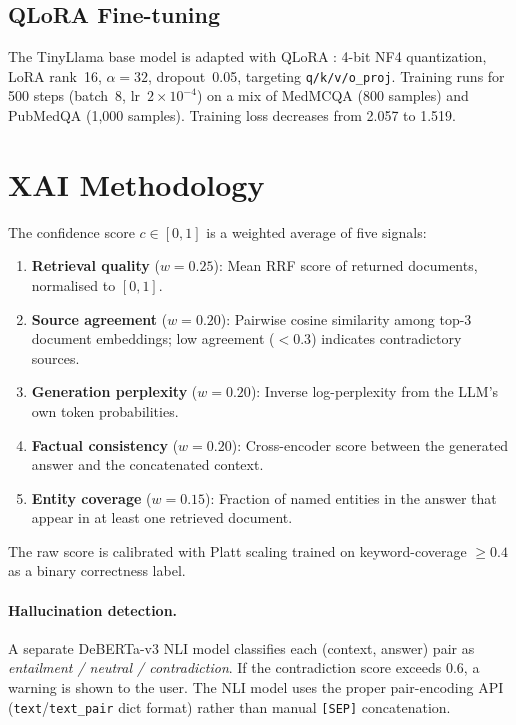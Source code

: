 \documentclass[10pt,twocolumn]{article}
\begin{document}
\subsection{QLoRA Fine-tuning}
The TinyLlama base model is adapted with QLoRA \cite{dettmers2023qlora}:
4-bit NF4 quantization, LoRA rank~16, $\alpha=32$, dropout~0.05, targeting
\texttt{q/k/v/o\_proj}.  Training runs for 500 steps (batch~8, lr~$2\times10^{-4}$) on a mix of MedMCQA (800 samples) and PubMedQA (1,000 samples).
Training loss decreases from 2.057 to 1.519.

\section{XAI Methodology}
\label{sec:xai}

The confidence score $c \in [0,1]$ is a weighted average of five signals:

\begin{enumerate}[noitemsep]
  \item \textbf{Retrieval quality} ($w=0.25$): Mean RRF score of returned
        documents, normalised to $[0,1]$.
  \item \textbf{Source agreement} ($w=0.20$): Pairwise cosine similarity
        among top-3 document embeddings; low agreement ($<0.3$) indicates
        contradictory sources.
  \item \textbf{Generation perplexity} ($w=0.20$): Inverse log-perplexity
        from the LLM's own token probabilities.
  \item \textbf{Factual consistency} ($w=0.20$): Cross-encoder score between
        the generated answer and the concatenated context.
  \item \textbf{Entity coverage} ($w=0.15$): Fraction of named entities
        in the answer that appear in at least one retrieved document.
\end{enumerate}

\noindent
The raw score is calibrated with Platt scaling trained on keyword-coverage
$\ge 0.4$ as a binary correctness label.

\paragraph{Hallucination detection.}
A separate DeBERTa-v3 NLI model \cite{he2021deberta} classifies each
(context, answer) pair as \textit{entailment / neutral / contradiction}.
If the contradiction score exceeds 0.6, a warning is shown to the user.
The NLI model uses the proper pair-encoding API (\texttt{text}/\texttt{text\_pair}
dict format) rather than manual \texttt{[SEP]} concatenation.
\end{document}
